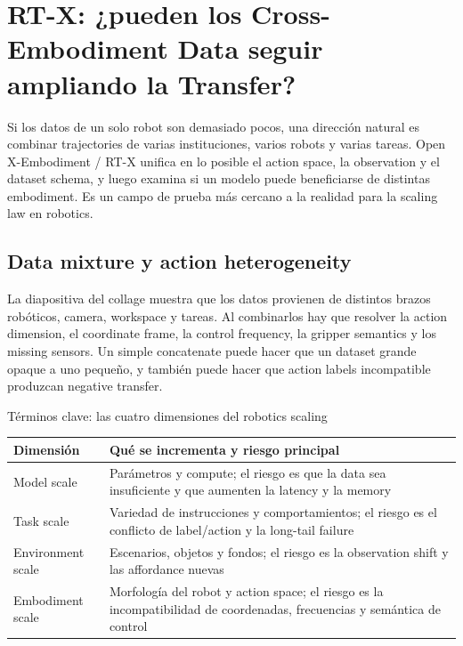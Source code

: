 \section{RT-X: ¿pueden los Cross-Embodiment Data seguir ampliando la Transfer?}

Si los datos de un solo robot son demasiado pocos, una dirección natural es combinar trajectories de varias instituciones, varios robots y varias tareas. Open X-Embodiment / RT-X unifica en lo posible el action space, la observation y el dataset schema, y luego examina si un modelo puede beneficiarse de distintas embodiment. Es un campo de prueba más cercano a la realidad para la scaling law en robotics.

\subsection{Data mixture y action heterogeneity}

La diapositiva del collage muestra que los datos provienen de distintos brazos robóticos, camera, workspace y tareas. Al combinarlos hay que resolver la action dimension, el coordinate frame, la control frequency, la gripper semantics y los missing sensors. Un simple concatenate puede hacer que un dataset grande opaque a uno pequeño, y también puede hacer que action labels incompatible produzcan negative transfer.



\begin{knowledgebox}{Términos clave: las cuatro dimensiones del robotics scaling}
\begin{tabularx}{\textwidth}{@{}L{0.18\textwidth}X@{}}
\toprule
Dimensión & Qué se incrementa y riesgo principal \\
\midrule
Model scale & Parámetros y compute; el riesgo es que la data sea insuficiente y que aumenten la latency y la memory \\
Task scale & Variedad de instrucciones y comportamientos; el riesgo es el conflicto de label/action y la long-tail failure \\
Environment scale & Escenarios, objetos y fondos; el riesgo es la observation shift y las affordance nuevas \\
Embodiment scale & Morfología del robot y action space; el riesgo es la incompatibilidad de coordenadas, frecuencias y semántica de control \\
\bottomrule
\end{tabularx}
\end{knowledgebox}


